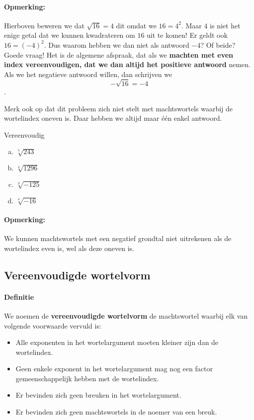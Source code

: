 \documentclass[12pt,twoside]{article}
\begin{document}
\paragraph*{Opmerking: }
Hierboven beweren we dat $\sqrt{16} = 4$ dit omdat we $16=4^2$. Maar $4$ is niet het enige getal dat we kunnen kwadrateren om $16$ uit te komen! Er geldt ook $16=(-4)^2$. Dus waarom hebben we dan niet als antwoord $-4$? Of beide? Goede vraag! Het is de algemene afspraak, dat als we \textbf{machten met even index vereenvoudigen, dat we dan altijd het positieve antwoord} nemen. Als we het negatieve antwoord willen, dan schrijven we $$- \sqrt {16} = - 4$$.

Merk ook op dat dit probleem zich niet stelt met machtswortels waarbij de wortelindex oneven is. Daar hebben we altijd maar één enkel antwoord.

\begin{oefening}
  Vereenvoudig
  \begin{enumerate}[(a)]
    \itemsep1em
  \item \(\sqrt[5]{{243}}\)
  \item \(\sqrt[4]{{1296}}\)
  \item \(\sqrt[3]{{ - 125}}\)
  \item \(\sqrt[4]{{ - 16}}\)
\end{enumerate}
\end{oefening}

\paragraph*{Opmerking: }
We kunnen machtswortels met een negatief grondtal niet uitrekenen als de wortelindex even is, wel als deze oneven is.

\subsection{Vereenvoudigde wortelvorm}

\paragraph{Definitie}
\begin{mdframed}
  We noemen de \textbf{vereenvoudigde wortelvorm} de machtswortel waarbij elk van volgende voorwaarde vervuld is:
  \begin{itemize}
  \item Alle exponenten in het wortelargument moeten kleiner zijn dan de wortelindex.
  \item Geen enkele exponent in het wortelargument mag nog een factor gemeenschappelijk hebben met de wortelindex.
  \item Er bevinden zich geen breuken in het wortelargument.
  \item Er bevinden zich geen machtswortels in de noemer van een breuk.
  \end{itemize}
\end{mdframed}
\end{document}
